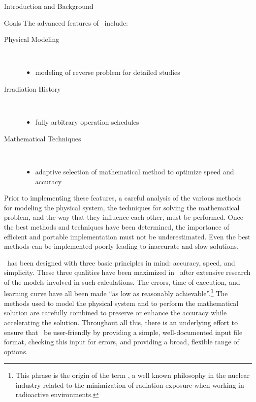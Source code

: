 \begin{chapter}{Introduction and Background}
\begin{section}{Goals}
    \noindent The advanced features of \ALARA\ include:
    \begin{description}
    \item[Physical Modeling]\ \\
      \vspace*{-1cm}
      \begin{itemize}
      \item modeling of reverse problem for detailed studies
      \end{itemize}
    \item[Irradiation History]\ \\
      \vspace*{-1cm}
      \begin{itemize}
      \item fully arbitrary operation schedules
      \end{itemize}
    \item[Mathematical Techniques]\ \\
      \vspace*{-1cm}
      \begin{itemize}
      \item adaptive selection of mathematical method to optimize
        speed and accuracy
      \end{itemize}
    \end{description}
    \renewcommand{\baselinestretch}{1.66}\normalsize
    
    Prior to implementing these features, a careful analysis of the
    various methods for modeling the physical system, the techniques
    for solving the mathematical problem, and the way that they
    influence each other, must be performed.  Once the best methods and
    techniques have been determined, the importance of efficient and
    portable implementation must not be underestimated.  Even the best
    methods can be implemented poorly leading to inaccurate and slow
    solutions.
    
    \ALARA\ has been designed with three basic principles in mind:
    accuracy, speed, and simplicity.  These three qualities have been
    maximized in \ALARA\ after extensive research of the models
    involved in such calculations.  The errors, time of execution, and
    learning curve have all been made ``as low as reasonably
    achievable''.\footnote{This phrase is the origin of the term
      \ALARA, a well known philosophy in the nuclear industry related
      to the minimization of radiation exposure when working in
      radioactive environments.}  The methods used to model the
    physical system and to perform the mathematical solution are
    carefully combined to preserve or enhance the accuracy while
    accelerating the solution.  Throughout all this, there is an
    underlying effort to ensure that \ALARA\ be user-friendly by
    providing a simple, well-documented input file format, checking
    this input for errors, and providing a broad, flexible range of
    options.
    

\end{section}
\end{chapter}
